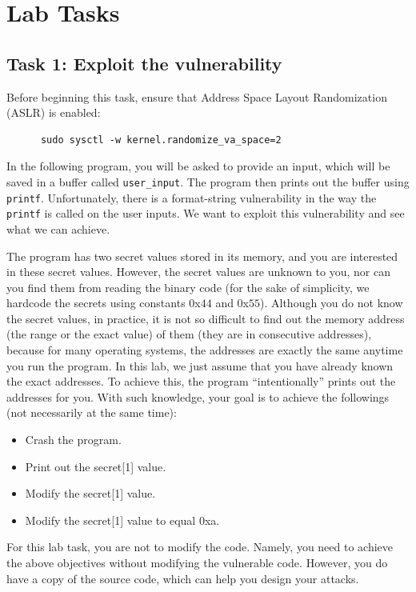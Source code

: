 \section{Lab Tasks}

\subsection{Task 1: Exploit the vulnerability}
Before beginning this task, ensure that Address Space Layout Randomization (ASLR) is enabled:
\begin{verbatim}
      sudo sysctl -w kernel.randomize_va_space=2
\end{verbatim}
In the following program, you will be asked to provide an input, which
will be saved in a buffer called {\tt user\_input}. 
The program then prints out the buffer using {\tt printf}.
Unfortunately, there is a format-string vulnerability in the way
the {\tt printf} is called on the user inputs. We want to exploit
this vulnerability and see what we can achieve.

The program has two secret values stored in its memory,
and you are interested in these secret values. However, 
the secret values are unknown to you, nor can you find them from reading the 
binary code (for the sake of simplicity, we hardcode the secrets 
using constants 0x$44$ and 0x$55$). 
Although you do not know the secret values, in practice, 
it is not so difficult to find out 
the memory address (the range or the exact value) of them (they are 
in consecutive addresses), because
for many operating systems, the addresses are exactly the same anytime you 
run the program. 
In this lab, we just assume that you have already known the exact addresses. 
To achieve this,
the program ``intentionally'' prints out the addresses for you. With such
knowledge, your goal is to achieve the followings (not necessarily at the 
same time): 
\begin{itemize} 
\item Crash the program.
\item Print out the secret[1] value.
\item Modify the secret[1] value.
\item Modify the secret[1] value to equal 0xa.
\end{itemize} 

For this lab task, you are not to modify the code. Namely, you need to achieve
the above objectives without modifying the vulnerable code.
However, you do have a copy of the source code, which can help 
you design your attacks.
 
